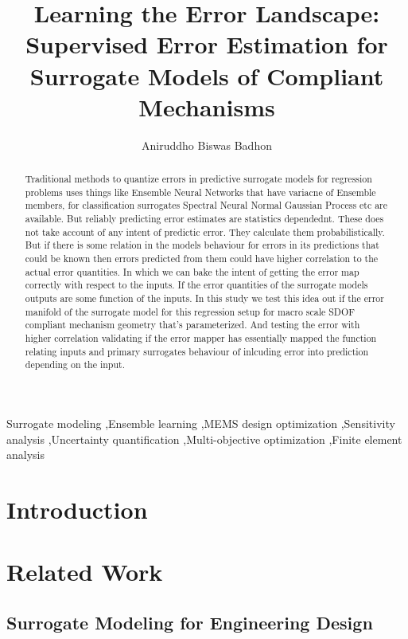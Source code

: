 \documentclass{elsarticle}
\title{Learning the Error Landscape: Supervised Error Estimation for Surrogate Models of Compliant Mechanisms}
\author[aff1]{Aniruddho Biswas Badhon}
\affiliation[aff1]{
    organization={Department of Mechanical Engineering, Bangladesh University of Engineering \& Technology},
    country={Bangladesh}
}
\begin{document}
\begin{frontmatter}
    \begin{abstract}
        Traditional methods to quantize errors in predictive surrogate models for regression problems uses things like Ensemble Neural Networks that have variacne of Ensemble members, for classification surrogates Spectral Neural Normal Gaussian Process etc are available. But reliably predicting error estimates are statistics dependednt. These does not take account of any intent of predictic error. They calculate them probabilistically. But if there is some relation in the models behaviour for errors in its predictions that could be known then errors predicted from them could have higher correlation to the actual error quantities. In which we can bake the intent of getting the error map correctly with respect to the inputs. If the error quantities of the surrogate models outputs are some function of the inputs. In this study we test this idea out if the error manifold of the surrogate model for this regression setup for macro scale SDOF compliant mechanism geometry that's parameterized. And testing the error with higher correlation validating if the error mapper has essentially mapped the function relating inputs and primary surrogates behaviour of inlcuding error into prediction depending on the input.
    \end{abstract}

    \begin{keyword}
        Surrogate modeling \sep Ensemble learning \sep MEMS design optimization \sep Sensitivity analysis \sep Uncertainty quantification \sep Multi-objective optimization \sep Finite element analysis
    \end{keyword}

\end{frontmatter}



\section{Introduction}
\label{sec:introduction}



\section{Related Work}
\label{sec:related_work}

\subsection{Surrogate Modeling for Engineering Design}
\end{document}
